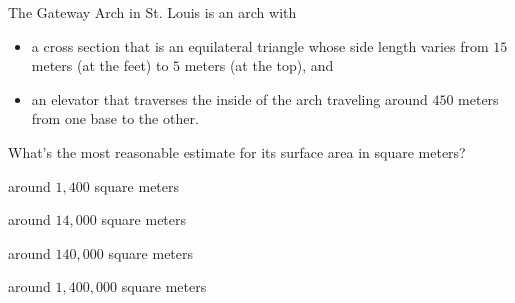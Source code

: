 \documentclass{ximera}
\begin{document}
\begin{exercise}
 The Gateway Arch in St. Louis is an arch with
\begin{itemize}
\item a cross section that is an equilateral triangle whose side
  length varies from $15$ meters (at the feet) to $5$ meters (at the
  top), and
\item an elevator that traverses the inside of the arch
  traveling around $450$ meters from one base to the other.
\end{itemize}
What's the most reasonable estimate for its surface area in square meters?
\begin{enumerate}\begin{multicols}{2}
  \item around $1,400$ square meters
  \item around $14,000$ square meters
  \item around $140,000$ square meters
  \item around $1,400,000$ square meters
  \end{multicols}
  \end{enumerate}
\end{exercise}




\end{document}
